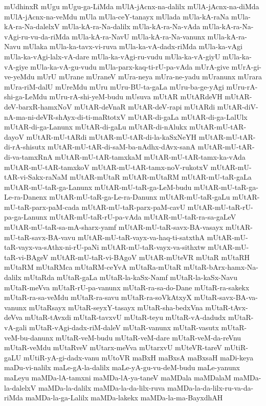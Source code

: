 {mUdhinxR
mUgu
mUgu-ga-LiMda
mUlA-jAcnx-na-dalilx
mUlA-jAcnx-na-diMda
mUlA-jAcnx-na-veMdu
mUla
mUla-ceY-tanayx
mUlada
mUla-kA-raNa
mUla-kA-ra-Na-dalelxV
mUla-kA-ra-Na-dalilx
mUla-kA-ra-Na-vAda
mUla-kA-ra-Na-vAgi-ru-vu-da-riMda
mUla-kA-ra-NavU
mUla-kA-ra-Na-vanunx
mUla-kA-ra-Navu
mUlaka
mUla-ka-tavx-vi-ruva
mUla-ka-vA-dadx-riMda
mUla-ka-vAgi
mUla-ka-vAgi-lalx-vA-dare
mUla-ka-vAgi-ru-vudu
mUla-ka-vA-giyU
mUla-ka-vA-giye
mUla-ka-vA-gu-vudu
mUla-parx-kaq-ti-rU-pa-vAda
mUrA-give
mUrA-gi-ve-yeMdu
mUrU
mUrane
mUraneV
mUra-neya
mUra-ne-yadu
mUranunx
mUrara
mUra-riM-dalU
mUreMdu
mUru
mUru-BU-ta-gaLa
mUru-ba-ge-yAgi
mUru-rA-shi-ga-LeMdu
mUru-rA-shi-yeM-budu
mUsuva
mUtAR
mUtARdeVH
mUtAR-deV-barxR-hamxNoV
mUtAR-deVnaR
mUtAR-deV-rapi
mUtARdi
mUtAR-diV-nA-ma-ni-deVR-shAyx-di-ti-maRtotxV
mUtAR-di-gaLa
mUtAR-di-ga-LalUlx
mUtAR-di-ga-Lanunx
mUtAR-di-gaLu
mUtAR-di-nAlukx
mUtAR-mU-tAR-dayoV
mUtAR-mU-tARdi
mUtAR-mU-tAR-di-la-kaSxNeYH
mUtAR-mU-tAR-di-rA-shisutx
mUtAR-mU-tAR-di-saM-ba-nAdhx-dAvx-sanA
mUtAR-mU-tAR-di-va-tamxRnA
mUtAR-mU-tAR-tamxkaM
mUtAR-mU-tAR-tamx-ka-vAda
mUtAR-mU-tAR-tamxkoV
mUtAR-mU-tAR-tamx-noV-rukotxV
mUtAR-mU-tAR-vi-Sakx-raNaM
mUtAR-mUtaR
mUtAR-mUtaRM
mUtAR-mU-taR-gaLa
mUtAR-mU-taR-ga-Lanunx
mUtAR-mU-taR-ga-LeM-budu
mUtAR-mU-taR-ga-Le-ra-Danenx
mUtAR-mU-taR-ga-Le-ra-Danunx
mUtAR-mU-taR-gaLu
mUtAR-mU-taR-parx-paM-cada
mUtAR-mU-taR-parx-paM-cavU
mUtAR-mU-taR-rU-pa-ga-Lanunx
mUtAR-mU-taR-rU-pa-vAda
mUtAR-mU-taR-ra-sa-gaLeV
mUtAR-mU-taR-sa-mA-sharx-yamf
mUtAR-mU-taR-savx-BA-vasayx
mUtAR-mU-taR-savx-BA-vavu
mUtAR-mU-taR-vayx-va-haq-ti-satxthA
mUtAR-mU-taR-vayx-va-sAthx-ni-rU-paNi
mUtAR-mU-taR-vayx-va-sithxtw
mUtAR-mU-taR-vi-BAgeV
mUtAR-mU-taR-vi-BAgoV
mUtAR-mUteVR
mUtaR
mUtaRH
mUtaRM
mUtaRMca
mUtaRM-ceYvA
mUtaRa-mUtaR
mUtaR-bArx-hamx-Na-dalilx
mUtaRda
mUtaR-gaLa
mUtaR-la-kaSx-Namf
mUtaR-la-kaSx-Navu
mUtaR-meVva
mUtaR-rU-pa-vanunx
mUtaR-ra-sa-do-Dane
mUtaR-ra-sakekx
mUtaR-ra-sa-veMdu
mUtaR-ra-savu
mUtaR-ra-soVkAtxyX
mUtaR-savx-BA-va-vanunx
mUtaRsayx
mUtaR-seyxY-tasayx
mUtaR-sha-bedxVna
mUtaR-tAvx-deVva
mUtaR-tAvxdi
mUtaR-tavxvU
mUtaR-teyu
mUtaR-vA-dadudx
mUtaR-vA-gali
mUtaR-vAgi-dadx-riM-daleV
mUtaR-vanunx
mUtaR-vasutx
mUtaR-veM-bu-danunx
mUtaR-veM-budu
mUtaR-veM-dare
mUtaR-veM-da-reVnu
mUtaR-veMdu
mUtaRveV
mUtarx-meVva
mUtarxvU
mUteVR-tareV
mUtiR-gaLU
mUtiR-yA-gi-dadx-vanu
mUtoVR
maBxH
maBxsA
maBxsaH
maDi-keya
maDu-vi-nalilx
maLe-gA-la-dalilx
maLe-yA-gu-vu-deM-budu
maLe-yanunx
maLeyu
maMDa-lA-tamxni
maMDa-lA-ya-taneV
maMDala
maMDalaM
maMDa-la-dalelxV
maMDa-la-dalilx
maMDa-la-da-lilx-ruva
maMDa-la-da-lilx-ru-va-da-riMda
maMDa-la-ga-Lalilx
maMDa-lakekx
maMDa-la-ma-BayxdhAH
}
